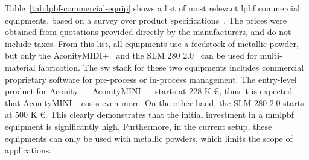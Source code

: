Table~\ref{tab:lpbf-commercial-equip} shows a list of most relevant \gls{lpbf}
commercial equipments, based on a survey over product specifications~\cite{aconityMINI, aconityMIDI, trumpf300, slm280, slm280Temp, renishawAM500, eosM300}. The
prices were obtained from quotations provided directly by the manufacturers, and
do not include taxes.
From this list, all equipments use a feedstock of metallic powder, but only the AconityMIDI+~\cite{aconityMIDI}
and the SLM 280 2.0~\cite{slm280} can be used for multi-material fabrication. The \gls{sw} stack for
these two equipments includes commercial proprietary software for pre-process or
in-process management. The entry-level product for Aconity --- AconityMINI ---
starts at 228 K €, thus it is expected that AconityMINI+ costs even more. On the
other hand, the
SLM 280 2.0 starts at 500 K €. This clearly demonstrates that the initial
investment in a \gls{mmlpbf} equipment is significantly high. Furthermore, in
the current setup, these equipments can only be used with metallic powders,
which limits the scope of applications.

